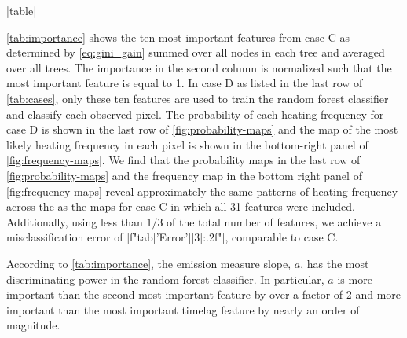 \py[manager_ml]|table|

\autoref{tab:importance} shows the ten most important features from case C as determined by \autoref{eq:gini_gain} summed over all nodes in each tree and averaged over all trees. The importance in the second column is normalized such that the most important feature is equal to 1. In case D as listed in the last row of \autoref{tab:cases}, only these ten features are used to train the random forest classifier and classify each observed pixel. The probability of each heating frequency for case D is shown in the last row of \autoref{fig:probability-maps} and the map of the most likely heating frequency in each pixel is shown in the bottom-right panel of \autoref{fig:frequency-maps}. We find that the probability maps in the last row of \autoref{fig:probability-maps} and the frequency map in the bottom right panel of \autoref{fig:frequency-maps} reveal approximately the same patterns of heating frequency across the \AR{} as the maps for case C in which all 31 features were included. Additionally, using less than $1/3$ of the total number of features, we achieve a misclassification error of \py[manager_ml]|f"{tab['Error'][3]:.2f}"|, comparable to case C.

According to \autoref{tab:importance}, the emission measure slope, $a$, has the most discriminating power in the random forest classifier. In particular, $a$ is more important than the second most important feature by over a factor of 2 and more important than the most important timelag feature by nearly an order of magnitude.

